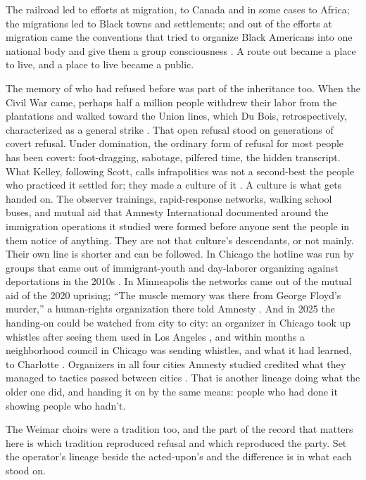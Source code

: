 The railroad led to efforts at migration, to Canada and in some cases to Africa; the migrations led to Black towns and settlements; and out of the efforts at migration came the conventions that tried to organize Black Americans into one national body and give them a group consciousness \autocite[26]{dubois1907economic}. A route out became a place to live, and a place to live became a public.

The memory of who had refused before was part of the inheritance too. When the Civil War came, perhaps half a million people withdrew their labor from the plantations and walked toward the Union lines, which Du Bois, retrospectively, characterized as a general strike \autocite[ch.~4]{dubois1935black}. That open refusal stood on generations of covert refusal. Under domination, the ordinary form of refusal for most people has been covert: foot-dragging, sabotage, pilfered time, the hidden transcript. What Kelley, following Scott, calls infrapolitics was not a second-best the people who practiced it settled for; they made a culture of it \autocite{scott1990domination,kelley1994race}. A culture is what gets handed on. The observer trainings, rapid-response networks, walking school buses, and mutual aid that Amnesty International documented around the immigration operations it studied \autocite{Amnesty2026Whistles} were formed before anyone sent the people in them notice of anything. They are not that culture's descendants, or not mainly. Their own line is shorter and can be followed. In Chicago the hotline was run by groups that came out of immigrant-youth and day-laborer organizing against deportations in the 2010s \autocite{unzueta2018love,hlass2022lawyering}. In Minneapolis the networks came out of the mutual aid of the 2020 uprising; “The muscle memory was there from George Floyd's murder,” a human-rights organization there told Amnesty \autocite[49–50]{Amnesty2026Whistles}. And in 2025 the handing-on could be watched from city to city: an organizer in Chicago took up whistles after seeing them used in Los Angeles \autocite{savchenko2025whistles}, and within months a neighborhood council in Chicago was sending whistles, and what it had learned, to Charlotte \autocite{jacobo2025cbs}. Organizers in all four cities Amnesty studied credited what they managed to tactics passed between cities \autocite[145–146]{Amnesty2026Whistles}. That is another lineage doing what the older one did, and handing it on by the same means: people who had done it showing people who hadn't.

The Weimar choirs were a tradition too, and the part of the record that matters here is which tradition reproduced refusal and which reproduced the party. Set the operator's lineage beside the acted-upon's and the difference is in what each stood on.

